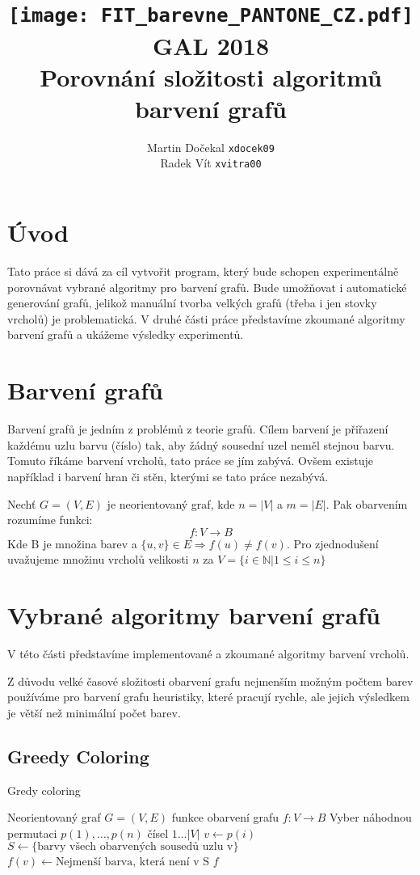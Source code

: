 \documentclass[12pt, a4paper]{article}
\author{Martin Dočekal \texttt{xdocek09}\\Radek Vít \texttt{xvitra00}}
\title{
	\texttt{[image: FIT\_barevne\_PANTONE\_CZ.pdf]}\\
	GAL 2018\\
	Porovnání složitosti algoritmů barvení grafů
}
\begin{document}
\newpage
\maketitle

\newpage

\section{Úvod}
Tato práce si dává za cíl vytvořit program, který bude schopen experimentálně porovnávat vybrané algoritmy pro barvení grafů. Bude umožňovat i automatické generování grafů, jelikož manuální tvorba velkých grafů (třeba i jen stovky vrcholů) je problematická.
V druhé části práce představíme zkoumané algoritmy barvení grafů a ukážeme výsledky experimentů.

\section{Barvení grafů}
Barvení grafů je jedním z problémů z teorie grafů. Cílem barvení je přiřazení každému uzlu barvu (číslo) tak, aby žádný sousední uzel neměl stejnou barvu.
Tomuto říkáme barvení vrcholů, tato práce se jím zabývá.
Ovšem existuje například i barvení hran či stěn, kterými se tato práce nezabývá. %

Nechť $G=(V,E)$ je neorientovaný graf, kde $n = |V|$ a $m = |E|$. Pak obarvením rozumíme funkci:
$$f: 	V \rightarrow B$$
Kde B je množina barev a $\{ u, v \} \in E \Rightarrow f(u) \not= f(v)$. %
Pro zjednodušení uvažujeme množinu vrcholů velikosti $n$ za $V = \{ i \in \mathbb{N} | 1 \leq i \leq n \}$

\section{Vybrané algoritmy barvení grafů}
V této části představíme implementované a zkoumané algoritmy barvení vrcholů.

Z důvodu velké časové složitosti obarvení grafu nejmenším možným počtem barev používáme
pro barvení grafu heuristiky, které pracují rychle, ale jejich výsledkem je větší než minimální počet barev.
\subsection{Greedy Coloring}
\begin{algorithm}
\caption{Gredy coloring} %
\label{Greedy coloring}
\begin{algorithmic}
\Input Neorientovaný graf $G = (V, E)$
\Output funkce obarvení grafu $f: 	V \rightarrow B$
\State Vyber náhodnou permutaci $p(1), \dots, p(n)$ čísel $1 \dots |V|$
	\State $v \leftarrow p(i)$
	\State $S \leftarrow \{ \text{barvy všech obarvených sousedů uzlu v} \}$
	\State $f(v) \leftarrow \text{Nejmenší barva, která není v S}$ 
\EndFor
\State \Return $f$
\end{algorithmic}
\end{algorithm}
\end{document}
